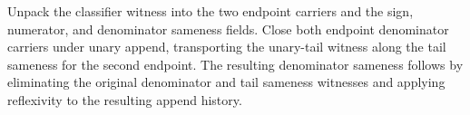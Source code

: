 Unpack the classifier witness into the two endpoint carriers and the sign,
numerator, and denominator sameness fields. Close both endpoint denominator
carriers under unary append, transporting the unary-tail witness along the
tail sameness for the second endpoint. The resulting denominator sameness follows by
eliminating the original denominator and tail sameness witnesses and applying
reflexivity to the resulting append history.
